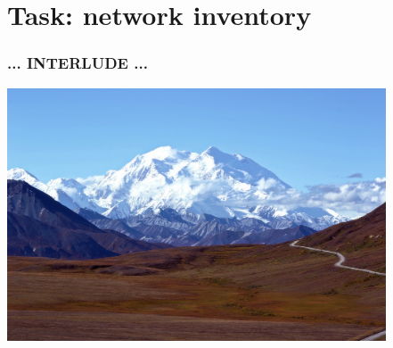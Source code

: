 \documentclass{beamer}
\begin{document}
\section{Task: network inventory}
%
%

\begin{frame}
    \frametitle{... INTERLUDE ...}

         \includegraphics[height=7.5cm]{./pics/montagne.jpg}

\end{frame}
\end{document}
